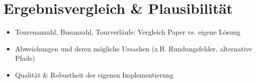 \section{Ergebnisvergleich \& Plausibilität}
\begin{itemize}
\item Tourenanzahl, Busanzahl, Tourverläufe: Vergleich Paper vs. eigene Lösung
\item Abweichungen und deren mögliche Ursachen (z.B. Rundungsfehler, alternative Pfade)
\item Qualität \& Robustheit der eigenen Implementierung
\end{itemize}

